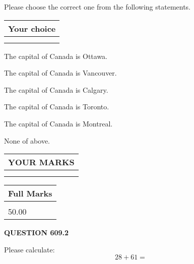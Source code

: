 \documentclass[12pt]{article}
\begin{document}
  
Please choose the correct one from the following statements.
  
  
\noindent\hspace{3.0in} \begin{tabular}{|l|}
\hline
Your choice \\
\hline
 \\ 
 \\ 
\hline
\end{tabular}
  
  
 
 
The capital of Canada is Ottawa.
 
 
The capital of Canada is Vancouver.
 
 
The capital of Canada is Calgary.
 
 
The capital of Canada is Toronto.
 
 
The capital of Canada is Montreal.
 
 
 None of above.
 
 
  
\vspace{0.2in}
  
\noindent\begin{tabular}{|l|}
\hline
 YOUR MARKS  \\
\hline
 \\ 
 \\ 
\hline
\end{tabular}
\hspace{0.05in} \begin{tabular}{|l|}
\hline
 Full Marks  \\
\hline
 \\ 
50.00 \\
\hline
\end{tabular}
{\textbf{\Large{QUESTION
609.2 
}}}
  
  
 
Please calculate:
\begin{equation}
28 +  %
61 = \nonumber
\end{equation}
 

 

 
   
   
 \vspace{0.2in}
 
   
   
   
   
\end{document}
